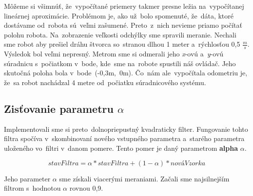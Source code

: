 Môžeme si všimnúť, že~vypočítané priemery takmer presne ležia na~vypočítanej lineárnej aproximácie. Problémom je, ako už~bolo spomenuté, že~dáta,
ktoré dostávame od~robota sú~veľmi zašumené. Preto~z~nich nevieme priamo počítať polohu robota. Na~zobrazenie veľkosti odchýlky sme spravili
meranie. Nechali sme robot aby prešiel dráhu štvorca so~stranou dlhou 1 meter a~rýchlosťou 0,5 \(\frac{m}{s}\). Výsledok bol veľmi nepresný.
Metrom sme si odmerali jeho \textit{x}-ovú a~\textit{y}-ovú súradnicu s~počiatkom v~bode, kde~sme na~robote spustili náš ovládač. Jeho skutočná
poloha bola v~bode~(-0,3m,~0m). Čo~nám ale~vypočítala odometriu je, že~sa robot nachádzal 4 metre od~počiatku súradnicového systému.

\subsection{Zisťovanie parametru \(\alpha\)}

Implementovali sme si preto~dolnopriepustný kvadraticky filter. Fungovanie tohto filtra spočíva v~skombinovaní nového vstupného parametra a~starého parametra
uloženého vo~filtri v~danom pomere. Tento pomer je daný parametrom \textbf{alpha} $\alpha$.

\begin{equation}
	stavFiltra = \alpha * stavFiltra + (1 - \alpha) * nováVzorka
	\label{eq:stateOfFilter}
\end{equation}

Jeho parameter $\alpha$ sme získali viacerými meraniami. Začali sme najsilnejším filtrom s~hodnotou $\alpha$ rovnou  0,9.

